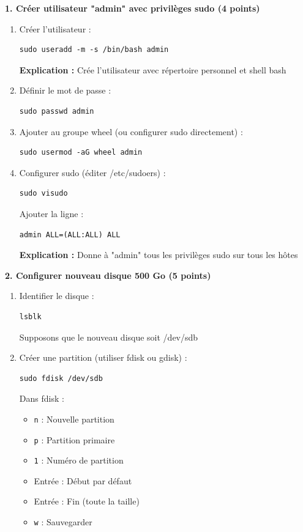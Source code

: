\documentclass[12pt,a4paper]{article}
\begin{document}
\begin{answerbox}
\textbf{1. Créer utilisateur "admin" avec privilèges sudo (4 points)}

\begin{enumerate}
    \item Créer l'utilisateur :
    \begin{lstlisting}
sudo useradd -m -s /bin/bash admin
    \end{lstlisting}
    \textbf{Explication :} Crée l'utilisateur avec répertoire personnel et shell bash
    
    \item Définir le mot de passe :
    \begin{lstlisting}
sudo passwd admin
    \end{lstlisting}
    
    \item Ajouter au groupe wheel (ou configurer sudo directement) :
    \begin{lstlisting}
sudo usermod -aG wheel admin
    \end{lstlisting}
    
    \item Configurer sudo (éditer /etc/sudoers) :
    \begin{lstlisting}
sudo visudo
    \end{lstlisting}
    
    Ajouter la ligne :
    \begin{verbatim}
admin ALL=(ALL:ALL) ALL
    \end{verbatim}
    
    \textbf{Explication :} Donne à "admin" tous les privilèges sudo sur tous les hôtes
\end{enumerate}

\textbf{2. Configurer nouveau disque 500 Go (5 points)}

\begin{enumerate}
    \item Identifier le disque :
    \begin{lstlisting}
lsblk
    \end{lstlisting}
    Supposons que le nouveau disque soit /dev/sdb
    
    \item Créer une partition (utiliser fdisk ou gdisk) :
    \begin{lstlisting}
sudo fdisk /dev/sdb
    \end{lstlisting}
    Dans fdisk :
    \begin{itemize}
        \item \texttt{n} : Nouvelle partition
        \item \texttt{p} : Partition primaire
        \item \texttt{1} : Numéro de partition
        \item Entrée : Début par défaut
        \item Entrée : Fin (toute la taille)
        \item \texttt{w} : Sauvegarder
    \end{itemize}
    

\end{enumerate}
\end{answerbox}
\end{document}
